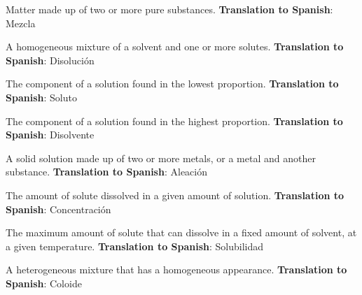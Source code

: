 \begin{vocabulary}[Mixture]
    Matter made up of two or more pure substances. \newline
    \textbf{Translation to Spanish}: Mezcla
\end{vocabulary}

\begin{vocabulary}[Solution]
    A homogeneous mixture of a solvent and one or more solutes. \newline
    \textbf{Translation to Spanish}: Disolución
\end{vocabulary}

\begin{vocabulary}[Solute]
    The component of a solution found in the lowest proportion. \newline
    \textbf{Translation to Spanish}: Soluto
\end{vocabulary}

\begin{vocabulary}[Solvent]
    The component of a solution found in the highest proportion. \newline
    \textbf{Translation to Spanish}: Disolvente
\end{vocabulary}

\begin{vocabulary}[Alloy]
    A solid solution made up of two or more metals, or a metal and another substance. \newline
    \textbf{Translation to Spanish}: Aleación
\end{vocabulary}

\begin{vocabulary}[Concentration]
    The amount of solute dissolved in a given amount of solution. \newline
    \textbf{Translation to Spanish}: Concentración
\end{vocabulary}

\begin{vocabulary}[Solubility]
    The maximum amount of solute that can dissolve in a fixed amount of solvent, at a given temperature. \newline
    \textbf{Translation to Spanish}: Solubilidad
\end{vocabulary}

\begin{vocabulary}[Colloid]
    A heterogeneous mixture that has a homogeneous appearance. \newline
    \textbf{Translation to Spanish}: Coloide
\end{vocabulary}

